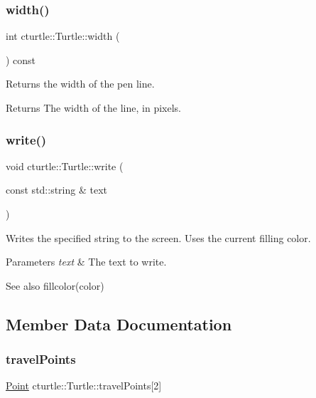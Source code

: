 \subsubsection{\texorpdfstring{width()}{width()}\hspace{0.1cm}{\footnotesize\ttfamily [2/2]}}
{\footnotesize\ttfamily int cturtle\+::\+Turtle\+::width (\begin{DoxyParamCaption}{ }\end{DoxyParamCaption}) const\hspace{0.3cm}{\ttfamily [inline]}}

Returns the width of the pen line. \begin{DoxyReturn}{Returns}
The width of the line, in pixels. 
\end{DoxyReturn}
\mbox{\label{classcturtle_1_1Turtle_a6e814845ac619a90aeee25a67a3fc51d}} 
\subsubsection{\texorpdfstring{write()}{write()}}
{\footnotesize\ttfamily void cturtle\+::\+Turtle\+::write (\begin{DoxyParamCaption}\item[{const std\+::string \&}]{text }\end{DoxyParamCaption})}

Writes the specified string to the screen. Uses the current filling color. 
\begin{DoxyParams}{Parameters}
{\em text} & The text to write. \\
\hline
\end{DoxyParams}
\begin{DoxySeeAlso}{See also}
fillcolor(color) 
\end{DoxySeeAlso}


\subsection{Member Data Documentation}
\mbox{\label{classcturtle_1_1Turtle_ab7156951a007fbbc8a07cbb66e7b888b}} 
\subsubsection{\texorpdfstring{travel\+Points}{travelPoints}}
{\footnotesize\ttfamily \hyperlink{structcturtle_1_1ivec2}{Point} cturtle\+::\+Turtle\+::travel\+Points\mbox{[}2\mbox{]}\hspace{0.3cm}{\ttfamily [protected]}}

